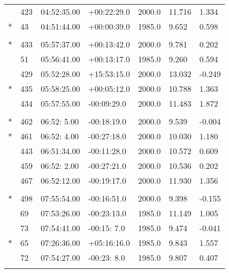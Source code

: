 \documentclass[10pt]{report}
\renewcommand{\[}{\begin{eqnarray}}
\renewcommand{\]}{\end{eqnarray}}
\begin{document}
\begin{tabular}{lllllll}
 &423&04:52:35.00&+00:22:29.0&2000.0 & 11.716 &  1.334 \\
$\ast$& 43&04:51:44.00&+00:00:39.0&1985.0 &  9.652 &  0.598 \\
\multicolumn{7}{l}{ }\\
$\ast$&433&05:57:37.00&+00:13:42.0&2000.0 &  9.781 &  0.202 \\
 & 51&05:56:41.00&+00:13:17.0&1985.0 &  9.260 &  0.594 \\
 &429&05:52:28.00&+15:53:15.0&2000.0 & 13.032 & -0.249 \\
$\ast$&435&05:58:25.00&+00:05:12.0&2000.0 & 10.788 &  1.363 \\
 &434&05:57:55.00&-00:09:29.0&2000.0 & 11.483 &  1.872 \\
\multicolumn{7}{l}{ }\\
$\ast$&462&06:52: 5.00&-00:18:19.0&2000.0 &  9.539 & -0.004 \\
$\ast$&461&06:52: 4.00&-00:27:18.0&2000.0 & 10.030 &  1.180 \\
 &443&06:51:34.00&-00:11:28.0&2000.0 & 10.572 &  0.609 \\
 &459&06:52: 2.00&-00:27:21.0&2000.0 & 10.536 &  0.202 \\
 &467&06:52:12.00&-00:19:17.0&2000.0 & 11.930 &  1.356 \\
\multicolumn{7}{l}{ }\\
$\ast$&498&07:55:54.00&-00:16:51.0&2000.0 &  9.398 & -0.155 \\
 & 69&07:53:26.00&-00:23:13.0&1985.0 & 11.149 &  1.005 \\
 & 73&07:54:41.00&-00:15: 7.0&1985.0 &  9.474 & -0.041 \\
$\ast$& 65&07:26:36.00&+05:16:16.0&1985.0 &  9.843 &  1.557 \\
 & 72&07:54:27.00&-00:23: 8.0&1985.0 &  9.807 &  0.407 \\
\multicolumn{7}{l}{ }
\end{tabular}
\pagebreak
\end{document}

